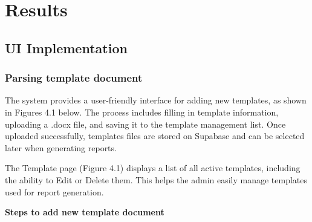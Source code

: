 \chapter{Results}

\section{UI Implementation}

\subsection{Parsing template document}
The system provides a user-friendly interface for adding new templates, as shown in Figures 4.1 below. The process includes filling in template information, uploading a .docx file, and saving it to the template management list. Once uploaded successfully, templates files are stored on Supabase and can be selected later when generating reports.

The Template page (Figure 4.1) displays a list of all active templates, including the ability to Edit or Delete them. This helps the admin easily manage templates used for report generation.

\textbf{Steps to add new template document}

